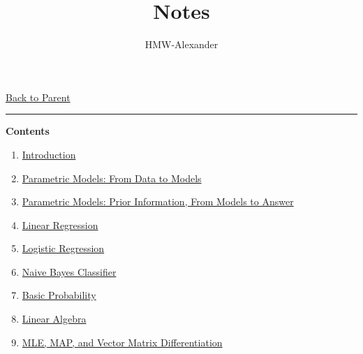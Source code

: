 \documentclass[letterpaper,11pt]{article}
\title{\textbf{Notes}}
\author{HMW-Alexander}
\newcommand{\panhline}{\begin{center}\rule{\textwidth}{1pt}\end{center}}
\begin{document}
\maketitle
\href{../index.html}{Back to Parent}

\panhline
\textbf{Contents}

\begin{enumerate}
	\item \href{./01_Introduction/document.html}{Introduction}
	\item \href{./02_ParametricModels/document.html}{Parametric Models: From Data to Models}
	\item \href{./03_ParametricModels/document.html}{Parametric Models: Prior Information, From Models to Answer}
	\item \href{./04_LinearRegression/document.html}{Linear Regression}
	\item \href{./05_LogisticRegression/document.html}{Logistic Regression}
	\item \href{./06_NaiveBayesClassifier/document.html}{Naive Bayes Classifier}
	\item \href{./R1_BasicProbability/document.html}{Basic Probability}
	\item \href{./R2_LinearAlgebra/document.html}{Linear Algebra}
	\item \href{./R2_MleMapVectorMatrixDifferentiation/document.html}{MLE, MAP, and Vector Matrix Differentiation}
\end{enumerate}
\end{document}
